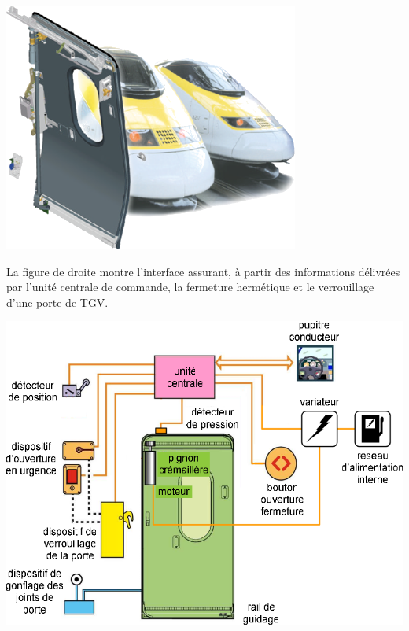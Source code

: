 \begin{minipage}[c]{.45\linewidth}
\begin{center}
\includegraphics[width=.6\textwidth]{png/fig_01-TGV}
\end{center}
 
 La figure de droite montre l’interface assurant, à partir des informations délivrées par l’unité centrale de commande, la fermeture hermétique et le verrouillage d’une porte de TGV. 
 
\end{minipage} \hfill
\begin{minipage}[c]{.52\linewidth}
\begin{center}
\includegraphics[width=\textwidth]{png/fig_02-TGV}
\end{center}
\end{minipage}

